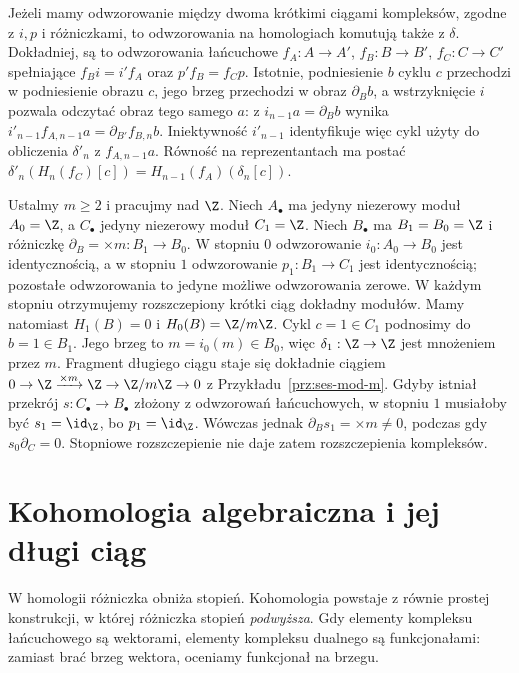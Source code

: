 \begin{uwaga}
\label{uwaga:les-naturalnosc}
Jeżeli mamy odwzorowanie między dwoma krótkimi
ciągami kompleksów, zgodne z $i,p$ i
różniczkami, to odwzorowania na homologiach
komutują także z $\delta$.
Dokładniej, są to odwzorowania łańcuchowe
$f_A:A\to A'$, $f_B:B\to B'$, $f_C:C\to C'$ spełniające
$f_Bi=i'f_A$ oraz $p'f_B=f_Cp$.
Istotnie, podniesienie $b$ cyklu $c$ przechodzi
w podniesienie obrazu $c$, jego brzeg przechodzi
w obraz $\partial_Bb$, a wstrzyknięcie $i$
pozwala odczytać obraz tego samego $a$:
z $i_{n-1}a=\partial_Bb$ wynika
$i'_{n-1}f_{A,n-1}a=\partial_{B'}f_{B,n}b$.
Iniektywność $i'_{n-1}$ identyfikuje więc
cykl użyty do obliczenia $\delta'_n$ z $f_{A,n-1}a$.
Równość na reprezentantach ma postać
$\delta'_n(H_n(f_C)[c])
=H_{n-1}(f_A)(\delta_n[c])$.
\end{uwaga}

\begin{przyklad}
\label{prz:delta-razy-m}
Ustalmy $m\geq2$ i pracujmy nad $\Z$.
Niech $A_\bullet$ ma jedyny niezerowy moduł
$A_0=\Z$, a $C_\bullet$ jedyny niezerowy
moduł $C_1=\Z$. Niech $B_\bullet$ ma
$B_1=B_0=\Z$ i różniczkę
$\partial_B=\times m:B_1\to B_0$.
W stopniu $0$ odwzorowanie $i_0:A_0\to B_0$
jest identycznością, a w stopniu $1$
odwzorowanie $p_1:B_1\to C_1$ jest identycznością;
pozostałe odwzorowania to jedyne możliwe odwzorowania zerowe.
W każdym stopniu otrzymujemy rozszczepiony
krótki ciąg dokładny modułów. Mamy natomiast
$H_1(B)=0$ i $H_0(B)=\Z/m\Z$.
Cykl $c=1\in C_1$ podnosimy do $b=1\in B_1$.
Jego brzeg to $m=i_0(m)\in B_0$,
więc $\delta_1:\Z\to\Z$ jest mnożeniem przez $m$.
Fragment długiego ciągu staje się dokładnie
ciągiem $0\to\Z\xrightarrow{\times m}\Z
\to\Z/m\Z\to0$ z Przykładu~\ref{prz:ses-mod-m}.
Gdyby istniał przekrój $s:C_\bullet\to B_\bullet$
złożony z odwzorowań łańcuchowych, w stopniu $1$
musiałoby być $s_1=\id_{\Z}$, bo $p_1=\id_{\Z}$.
Wówczas jednak $\partial_Bs_1=\times m\ne0$,
podczas gdy $s_0\partial_C=0$.
Stopniowe rozszczepienie nie daje zatem
rozszczepienia kompleksów.
\end{przyklad}
\section{Kohomologia algebraiczna i jej długi ciąg}
\label{sec:kohomologia-algebraiczna}

W homologii różniczka obniża stopień.
Kohomologia powstaje z równie prostej
konstrukcji, w której różniczka stopień
\emph{podwyższa}. Gdy elementy kompleksu
łańcuchowego są wektorami, elementy
kompleksu dualnego są funkcjonałami:
zamiast brać brzeg wektora, oceniamy
funkcjonał na brzegu.

